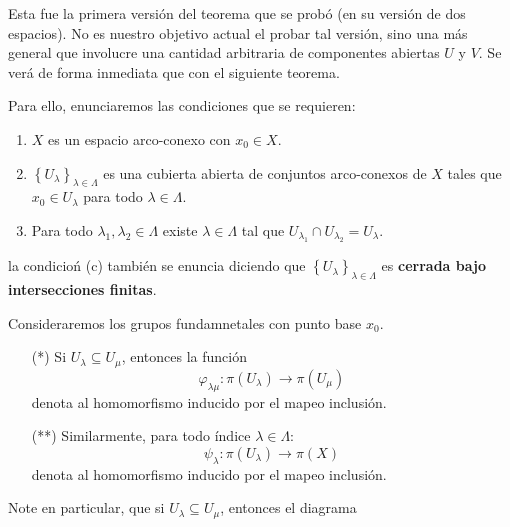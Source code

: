 \documentclass[12pt]{report}
\newcounter{it}
\theoremstyle{largebreak}
\newcommand\cf[3]{\ensuremath{#1:#2\rightarrow#3}}
\begin{document}
    Esta fue la primera versión del teorema que se probó (en su versión de dos espacios). No es nuestro objetivo actual el probar tal versión, sino una más general que involucre una cantidad arbitraria de componentes abiertas $U$ y $V$. Se verá de forma inmediata que con el siguiente teorema.

    Para ello, enunciaremos las condiciones que se requieren:

    \renewcommand{\theenumi}{\alph{enumi}}
    \begin{enumerate}[label = \textit{(\alph*)}]
        \item $X$ es un espacio arco-conexo con $x_0\in X$.
        \item  $\left\{U_\lambda \right\}_{\lambda\in\Lambda}$ es una cubierta abierta de conjuntos arco-conexos de $X$ tales que $x_0\in U_\lambda$ para todo $\lambda\in\Lambda$.
        \item Para todo $\lambda_1,\lambda_2\in\Lambda$ existe $\lambda\in\Lambda$ tal que $U_{\lambda_1}\cap U_{\lambda_2}=U_\lambda$.
    \end{enumerate}

    la condicioń (c) también se enuncia diciendo que $\left\{U_\lambda \right\}_{\lambda\in\Lambda}$ es \textbf{cerrada bajo intersecciones finitas}.

    Consideraremos los grupos fundamnetales con punto base $x_0$.

    \begin{itemize}
        \item[(*)] Si $U_\lambda\subseteq U_\mu$, entonces la función
        \begin{equation*}
            \cf{\varphi_{ \lambda\mu}}{\pi(U_\lambda)}{\pi(U_\mu)}
        \end{equation*}
        denota al homomorfismo inducido por el mapeo inclusión.
        \item[(**)] Similarmente, para todo índice $\lambda\in\Lambda$:
        \begin{equation*}
            \cf{\psi_\lambda}{\pi(U_\lambda)}{\pi(X)}
        \end{equation*}
        denota al homomorfismo inducido por el mapeo inclusión.
    \end{itemize}

    Note en particular, que si $U_\lambda\subseteq U_\mu$, entonces el diagrama
\end{document}

